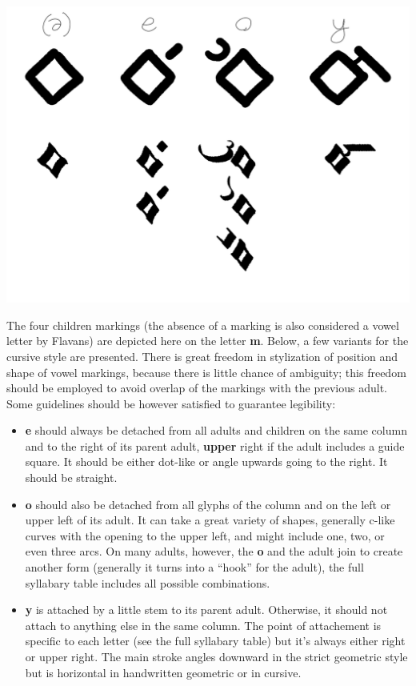 \documentclass[10pt,oneside]{memoir}
\begin{document}
\begin{center}
    \includegraphics{childrenguide}
\end{center}

The four children markings (the absence of a marking is also considered a vowel letter by Flavans) are depicted here on the letter \textbf{m}. Below, a few variants for the cursive style are presented. There is great freedom in stylization of position and shape of vowel markings, because there is little chance of ambiguity; this freedom should be employed to avoid overlap of the markings with the previous adult. Some guidelines should be however satisfied to guarantee legibility:

\begin{itemize}
    \item \textbf{e} should always be detached from all adults and children on the same column and to the right of its parent adult, \textbf{upper} right if the adult includes a guide square. It should be either dot-like or angle upwards going to the right. It should be straight.
    \item \textbf{o} should also be detached from all glyphs of the column and on the left or upper left of its adult. It can take a great variety of shapes, generally c-like curves with the opening to the upper left, and might include one, two, or even three arcs. On many adults, however, the \textbf{o} and the adult join to create another form (generally it turns into a ``hook'' for the adult), the full syllabary table includes all possible combinations.
    \item \textbf{y} is attached by a little stem to its parent adult. Otherwise, it should not attach to anything else in the same column. The point of attachement is specific to each letter (see the full syllabary table) but it's always either right or upper right. The main stroke angles downward in the strict geometric style but is horizontal in handwritten geometric or in cursive.
\end{itemize}
\end{document}
